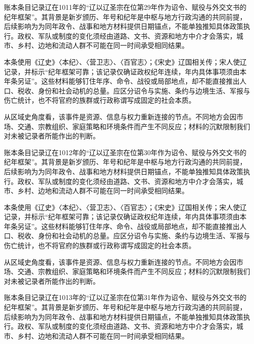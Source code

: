 账本条目记录辽在1011年的“辽以辽圣宗在位第29年作为诏令、赋役与外交文书的纪年框架”。其背景是新岁颁历、年号和纪年是中枢与地方行政沟通的共同前提，后续影响为为同年政令、战事和地方材料提供日期锚点，不能单独推知具体政策执行。政权、军队或制度的变化须经由道路、文书、资源和地方中介才会落实，城市、乡村、边地和流动人群不可能在同一时间承受相同结果。

本条使用《辽史》〈本纪〉、〈营卫志〉、〈百官志〉；《宋史》辽国相关传；宋人使辽记录，并标示“纪年框架可靠；该记录仅确证政权纪年连续，年内具体事项须由本年条另证”。这些材料能够钉住年序、命令、战役或局部地点，却不能直接推出人口、税收、身份和社会动机的总量。应区分诏令与实施、条约与边境生活、军报与伤亡统计，也不将官府的族群或行政称谓写成固定的社会本质。

从区域史角度看，该事件是资源、信息与权力重新连接的节点。不同地方会因市场、交通、宗教组织、家庭策略和环境条件而产生不同反应；材料的沉默限制我们对未被记录者所能作出的判断。

账本条目记录辽在1012年的“辽以辽圣宗在位第30年作为诏令、赋役与外交文书的纪年框架”。其背景是新岁颁历、年号和纪年是中枢与地方行政沟通的共同前提，后续影响为为同年政令、战事和地方材料提供日期锚点，不能单独推知具体政策执行。政权、军队或制度的变化须经由道路、文书、资源和地方中介才会落实，城市、乡村、边地和流动人群不可能在同一时间承受相同结果。

本条使用《辽史》〈本纪〉、〈营卫志〉、〈百官志〉；《宋史》辽国相关传；宋人使辽记录，并标示“纪年框架可靠；该记录仅确证政权纪年连续，年内具体事项须由本年条另证”。这些材料能够钉住年序、命令、战役或局部地点，却不能直接推出人口、税收、身份和社会动机的总量。应区分诏令与实施、条约与边境生活、军报与伤亡统计，也不将官府的族群或行政称谓写成固定的社会本质。

从区域史角度看，该事件是资源、信息与权力重新连接的节点。不同地方会因市场、交通、宗教组织、家庭策略和环境条件而产生不同反应；材料的沉默限制我们对未被记录者所能作出的判断。

账本条目记录辽在1013年的“辽以辽圣宗在位第31年作为诏令、赋役与外交文书的纪年框架”。其背景是新岁颁历、年号和纪年是中枢与地方行政沟通的共同前提，后续影响为为同年政令、战事和地方材料提供日期锚点，不能单独推知具体政策执行。政权、军队或制度的变化须经由道路、文书、资源和地方中介才会落实，城市、乡村、边地和流动人群不可能在同一时间承受相同结果。

